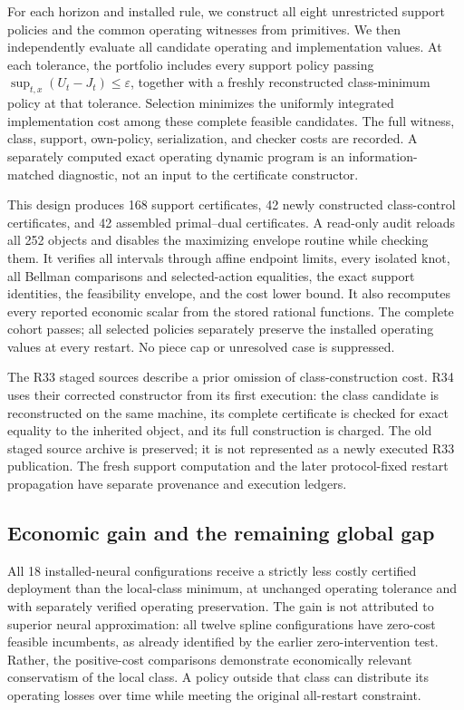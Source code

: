 For each horizon and installed rule, we construct all eight unrestricted support policies and the common operating witnesses from primitives. We then independently evaluate all candidate operating and implementation values. At each tolerance, the portfolio includes every support policy passing $\sup_{t,x}(U_t-J_t)\le\varepsilon$, together with a freshly reconstructed class-minimum policy at that tolerance. Selection minimizes the uniformly integrated implementation cost among these complete feasible candidates. The full witness, class, support, own-policy, serialization, and checker costs are recorded. A separately computed exact operating dynamic program is an information-matched diagnostic, not an input to the certificate constructor.

This design produces 168 support certificates, 42 newly constructed class-control certificates, and 42 assembled primal--dual certificates. A read-only audit reloads all 252 objects and disables the maximizing envelope routine while checking them. It verifies all intervals through affine endpoint limits, every isolated knot, all Bellman comparisons and selected-action equalities, the exact support identities, the feasibility envelope, and the cost lower bound. It also recomputes every reported economic scalar from the stored rational functions. The complete cohort passes; all selected policies separately preserve the installed operating values at every restart. No piece cap or unresolved case is suppressed.

The R33 staged sources describe a prior omission of class-construction cost. R34 uses their corrected constructor from its first execution: the class candidate is reconstructed on the same machine, its complete certificate is checked for exact equality to the inherited object, and its full construction is charged. The old staged source archive is preserved; it is not represented as a newly executed R33 publication. The fresh support computation and the later protocol-fixed restart propagation have separate provenance and execution ledgers.

\subsection{Economic gain and the remaining global gap}

All 18 installed-neural configurations receive a strictly less costly certified deployment than the local-class minimum, at unchanged operating tolerance and with separately verified operating preservation. The gain is not attributed to superior neural approximation: all twelve spline configurations have zero-cost feasible incumbents, as already identified by the earlier zero-intervention test. Rather, the positive-cost comparisons demonstrate economically relevant conservatism of the local class. A policy outside that class can distribute its operating losses over time while meeting the original all-restart constraint.

